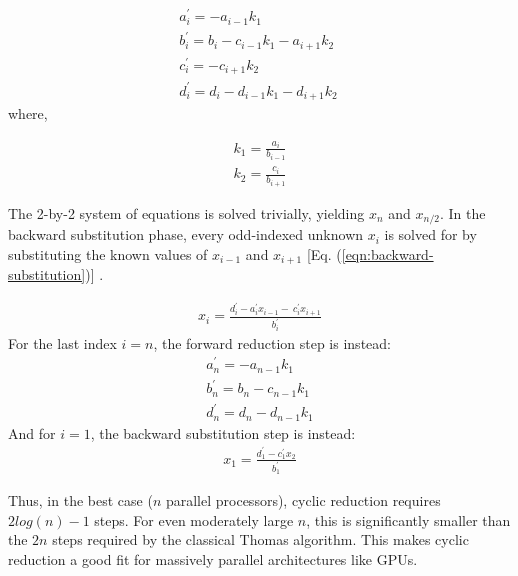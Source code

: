 \documentclass{elsarticle}
\begin{document}
\begin{align} 
& a^{\prime}_i = -a_{i-1}k_1 \
    \label{eqn:forward-reduction-1}& \\
& b^{\prime}_i = b_i - c_{i-1}k_1 - a_{i+1}k_2 \
    \label{eqn:forward-reduction-2}& \\
& c^{\prime}_i = -c_{i+1}k_2 \
    \label{eqn:forward-reduction-3}& \\
& d^{\prime}_i = d_i - d_{i-1}k_1  - d_{i+1}k_2 \
    \label{eqn:forward-reduction-4}&
\end{align}
%
where,

\begin{align}
& k_1 = \frac{a_i}{b_{i-1}} \label{eqn:k1-update}& \\
& k_2 = \frac{c_i}{b_{i+1}} \label{eqn:k2-update}&
\end{align}

The 2-by-2 system of equations is solved trivially,
yielding $x_n$ and $x_{n/2}$.
In the backward substitution phase,
every odd-indexed unknown $x_i$ is solved for by
substituting the known values of $x_{i-1}$ and $x_{i+1}$
[Eq. (\ref{eqn:backward-substitution})] .

\begin{align} \label{eqn:backward-substitution}
x_i = \frac{d^{\prime}_i - a^{\prime}_ix_{i-1} - \
    c^{\prime}_ix_{i+1}}{b^{\prime}_i}
\end{align}
%
For the last index $i=n$,
the forward reduction step is instead:
\begin{align} \label{eqn:forward-reduction-last}
    & a^{\prime}_n = -a_{n-1}k_1 & \\
    & b^{\prime}_n = b_n - c_{n-1}k_1 & \\
    & d^{\prime}_n = d_n - d_{n-1}k_1&
\end{align}
%
And for $i=1$, the backward substitution step is instead:
\begin{align} \label{eqn:backward-substitution-first}
x_1 = \frac{d^{\prime}_1 - c^{\prime}_1x_{2}}{b^{\prime}_1}
\end{align}

Thus, in the best case ($n$ parallel processors),
cyclic reduction requires 
$2log(n) - 1$ steps.
For even moderately large $n$,
this is significantly smaller than
the $2n$ steps required by the classical Thomas algorithm.
This makes cyclic reduction a good fit
for massively parallel architectures like GPUs.
\end{document}

